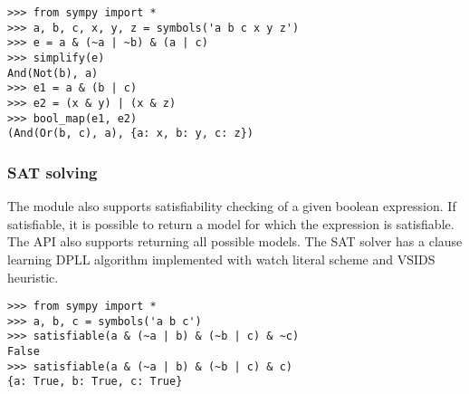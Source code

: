\begin{verbatim}
>>> from sympy import *
>>> a, b, c, x, y, z = symbols('a b c x y z')
>>> e = a & (~a | ~b) & (a | c)
>>> simplify(e)
And(Not(b), a)
>>> e1 = a & (b | c)
>>> e2 = (x & y) | (x & z)
>>> bool_map(e1, e2)
(And(Or(b, c), a), {a: x, b: y, c: z})
\end{verbatim}

\subsubsection{SAT solving}

The module also supports satisfiability checking of a given
boolean expression. If satisfiable, it is possible to return
a model for which the expression is satisfiable. The API also
supports returning all possible models. The SAT solver has
a clause learning DPLL algorithm implemented with watch
literal scheme and VSIDS heuristic\cite{moskewicz2008method}.

\begin{verbatim}
>>> from sympy import *
>>> a, b, c = symbols('a b c')
>>> satisfiable(a & (~a | b) & (~b | c) & ~c)
False
>>> satisfiable(a & (~a | b) & (~b | c) & c)
{a: True, b: True, c: True}
\end{verbatim}
